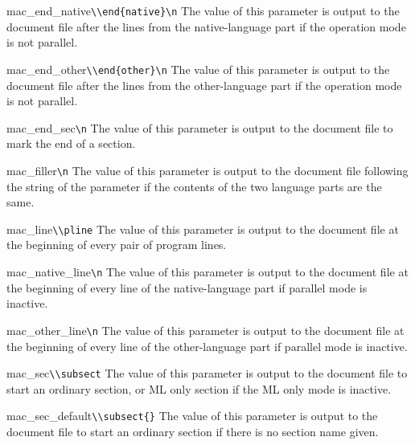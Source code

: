 \begin{describepara}{mac_end_native}{\verb*|\\end{native}\n|}\describe
The value of this parameter is output to the document file after the lines
from the native-language part if the operation mode is not parallel.
\end{describepara}
\begin{describepara}{mac_end_other}{\verb*|\\end{other}\n|}\describe
The value of this parameter is output to the document file after the lines
from the other-language part if the operation mode is not parallel.
\end{describepara}
\begin{describepara}{mac_end_sec}{\verb*|\n|}\describe
The value of this parameter is output to the document file to
mark the end of a section.
\end{describepara}
\begin{describepara}{mac_filler}{\verb|\n|}\describe
The value of this parameter is output to the document file following
the string of the parameter  if the contents of the two
language parts are the same.
\end{describepara}
\begin{describepara}{mac_line}{\verb*|\\pline|}\describe
The value of this parameter is output to the document file at the
beginning of every pair of program lines.
\end{describepara}
\begin{describepara}{mac_native_line}{\verb*|\n|}\describe
The value of this parameter is output to the document file at the
beginning of every line of the native-language part if parallel mode
is inactive.
\end{describepara}
\begin{describepara}{mac_other_line}{\verb*|\n|}\describe
The value of this parameter is output to the document file at the
beginning of every line of the other-language part if parallel mode
is inactive.
\end{describepara}\begin{describepara}{mac_sec}{\verb*|\\subsect|}\describe
The value of this parameter is output to the document file to start an
ordinary section, or ML only section if the ML only mode is inactive.
\end{describepara}
\begin{describepara}{mac_sec_default}{\verb*|\\subsect{}|}\describe
The value of this parameter is output to the document file to start an
ordinary section if there is no section name given.
\end{describepara}
